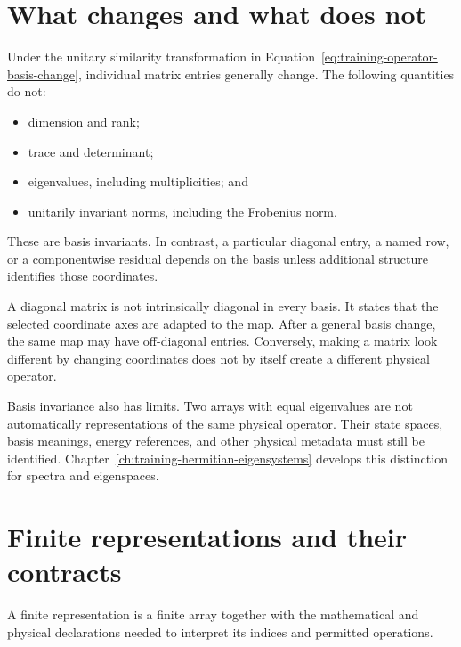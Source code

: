 \section{What changes and what does not}

Under the unitary similarity transformation in
Equation~\eqref{eq:training-operator-basis-change}, individual matrix entries
generally change. The following quantities do not:

\begin{itemize}
  \item dimension and rank;
  \item trace and determinant;
  \item eigenvalues, including multiplicities; and
  \item unitarily invariant norms, including the Frobenius norm.
\end{itemize}

These are basis invariants. In contrast, a particular diagonal entry, a named
row, or a componentwise residual depends on the basis unless additional
structure identifies those coordinates.

A diagonal matrix is not intrinsically diagonal in every basis. It states that
the selected coordinate axes are adapted to the map. After a general basis
change, the same map may have off-diagonal entries. Conversely, making a matrix
look different by changing coordinates does not by itself create a different
physical operator.

Basis invariance also has limits. Two arrays with equal eigenvalues are not
automatically representations of the same physical operator. Their state
spaces, basis meanings, energy references, and other physical metadata must
still be identified. Chapter~\ref{ch:training-hermitian-eigensystems} develops
this distinction for spectra and eigenspaces.

\section{Finite representations and their contracts}

\begin{definition}
A finite representation is a finite array together with the mathematical and
physical declarations needed to interpret its indices and permitted
operations.
\end{definition}

